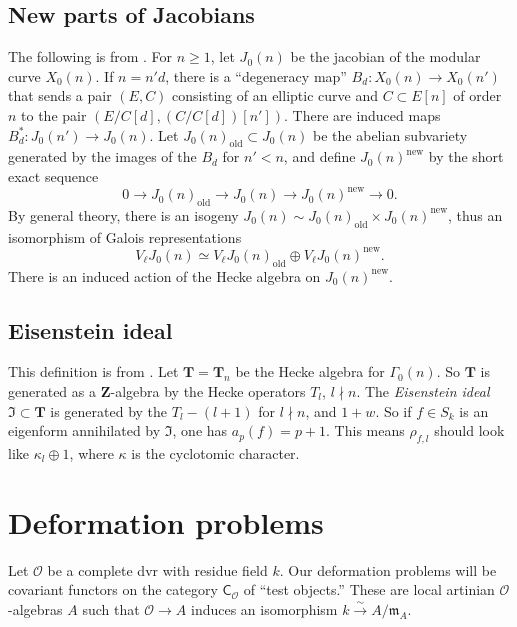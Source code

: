 \documentclass{amsart}
\newcommand{\cO}{\mathcal{O}}
\newcommand{\dT}{\mathbf{T}}
\newcommand{\dZ}{\mathbf{Z}}
\newcommand{\fI}{\mathfrak{I}}
\newcommand{\fm}{\mathfrak{m}}
\newcommand{\iso}{\xrightarrow\sim}
\begin{document}
\subsection{New parts of Jacobians}

The following is from \cite[\S 2]{mazur-1978}. 
For $n\geqslant 1$, let $J_0(n)$ be the jacobian of the modular curve $X_0(n)$. 
If $n=n' d$, there is a ``degeneracy map'' $B_d:X_0(n)\to X_0(n')$ that sends a 
pair $(E,C)$ consisting of an elliptic curve and $C\subset E[n]$ of order $n$ 
to the pair $(E/C[d],(C/C[d])[n'])$. There are induced maps 
$B_d^\ast:J_0(n')\to J_0(n)$. Let $J_0(n)_\mathrm{old}\subset J_0(n)$ be the 
abelian subvariety generated by the images of the $B_d$ for $n'<n$, and define 
$J_0(n)^\mathrm{new}$ by the short exact sequence 
\[
  0 \to J_0(n)_\mathrm{old} \to J_0(n) \to J_0(n)^\mathrm{new} \to 0 .
\]
By general theory, there is an isogeny 
$J_0(n)\sim J_0(n)_\mathrm{old}\times J_0(n)^\mathrm{new}$, thus an isomorphism 
of Galois representations 
\[
  V_\ell J_0(n) \simeq V_\ell J_0(n)_\mathrm{old}\oplus V_\ell J_0(n)^\mathrm{new} .
\]
There is an induced action of the Hecke algebra on $J_0(n)^\mathrm{new}$. 


\subsection{Eisenstein ideal}

This definition is from \cite[II.9]{mazur-1977}. Let $\dT=\dT_n$ be the Hecke 
algebra for $\Gamma_0(n)$. So $\dT$ is generated as a $\dZ$-algebra by the 
Hecke operators $T_l$, $l\nmid n$. The \emph{Eisenstein ideal} 
$\fI\subset \dT$ is generated by the $T_l-(l+1)$ for $l\nmid n$, and 
$1+w$. So if $f\in S_k$ is an eigenform annihilated by $\fI$, one has 
$a_p(f) = p+1$. This means $\rho_{f,l}$ should look like 
$\kappa_l\oplus 1$, where $\kappa$ is the cyclotomic character. 





\section{Deformation problems}

Let $\cO$ be a complete dvr with residue field $k$. Our deformation problems 
will be covariant functors on the category $\mathsf{C}_\cO$ of ``test 
objects.'' These are local artinian $\cO$-algebras $A$ such that 
$\cO\to A$ induces an isomorphism $k\iso A/\fm_A$. 
\end{document}
